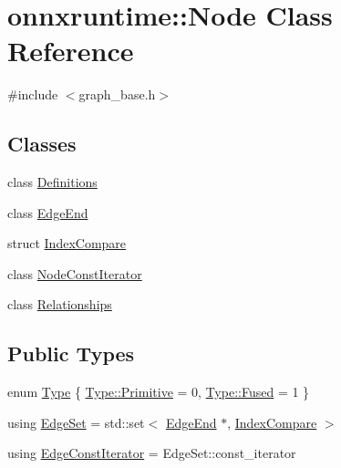 \hypertarget{classonnxruntime_1_1Node}{}\section{onnxruntime\+:\+:Node Class Reference}
\label{classonnxruntime_1_1Node}


{\ttfamily \#include $<$graph\+\_\+base.\+h$>$}

\subsection*{Classes}
\begin{DoxyCompactItemize}
\item 
class \mbox{\hyperlink{classonnxruntime_1_1Node_1_1Definitions}{Definitions}}
\item 
class \mbox{\hyperlink{classonnxruntime_1_1Node_1_1EdgeEnd}{Edge\+End}}
\item 
struct \mbox{\hyperlink{structonnxruntime_1_1Node_1_1IndexCompare}{Index\+Compare}}
\item 
class \mbox{\hyperlink{classonnxruntime_1_1Node_1_1NodeConstIterator}{Node\+Const\+Iterator}}
\item 
class \mbox{\hyperlink{classonnxruntime_1_1Node_1_1Relationships}{Relationships}}
\end{DoxyCompactItemize}
\subsection*{Public Types}
\begin{DoxyCompactItemize}
\item 
enum \mbox{\hyperlink{classonnxruntime_1_1Node_a2d9625711aecc66f9b9373d61f794f6a}{Type}} \{ \mbox{\hyperlink{classonnxruntime_1_1Node_a2d9625711aecc66f9b9373d61f794f6aa07ee3427562e4f1a5c9f2bfb17fd9eee}{Type\+::\+Primitive}} = 0, 
\mbox{\hyperlink{classonnxruntime_1_1Node_a2d9625711aecc66f9b9373d61f794f6aaf617f46b788e11a564cb16c9f5d59fea}{Type\+::\+Fused}} = 1
 \}
\item 
using \mbox{\hyperlink{classonnxruntime_1_1Node_a21f67a4ba50eb4c6dea0c37982b48da8}{Edge\+Set}} = std\+::set$<$ \mbox{\hyperlink{classonnxruntime_1_1Node_1_1EdgeEnd}{Edge\+End}} $\ast$, \mbox{\hyperlink{structonnxruntime_1_1Node_1_1IndexCompare}{Index\+Compare}} $>$
\item 
using \mbox{\hyperlink{classonnxruntime_1_1Node_ae0df52e26b0237505b6a0cbc25106d9d}{Edge\+Const\+Iterator}} = Edge\+Set\+::const\+\_\+iterator
\end{DoxyCompactItemize}
